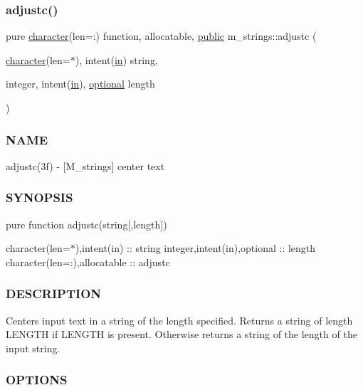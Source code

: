 \subsubsection{\texorpdfstring{adjustc()}{adjustc()}}
{\footnotesize\ttfamily pure \hyperlink{option__stopwatch_83_8txt_abd4b21fbbd175834027b5224bfe97e66}{character}(len=\+:) function, allocatable, \hyperlink{M__stopwatch_83_8txt_a2f74811300c361e53b430611a7d1769f}{public} m\+\_\+strings\+::adjustc (\begin{DoxyParamCaption}\item[{\hyperlink{option__stopwatch_83_8txt_abd4b21fbbd175834027b5224bfe97e66}{character}(len=$\ast$), intent(\hyperlink{M__journal_83_8txt_afce72651d1eed785a2132bee863b2f38}{in})}]{string,  }\item[{integer, intent(\hyperlink{M__journal_83_8txt_afce72651d1eed785a2132bee863b2f38}{in}), \hyperlink{option__stopwatch_83_8txt_aa4ece75e7acf58a4843f70fe18c3ade5}{optional}}]{length }\end{DoxyParamCaption})}



\subsubsection*{N\+A\+ME}

adjustc(3f) -\/ \mbox{[}M\+\_\+strings\mbox{]} center text 

\subsubsection*{S\+Y\+N\+O\+P\+S\+IS}

pure function adjustc(string\mbox{[},length\mbox{]})

character(len=$\ast$),intent(in) \+:\+: string integer,intent(in),optional \+:\+: length character(len=\+:),allocatable \+:\+: adjustc

\subsubsection*{D\+E\+S\+C\+R\+I\+P\+T\+I\+ON}

Centers input text in a string of the length specified. Returns a string of length L\+E\+N\+G\+TH if L\+E\+N\+G\+TH is present. Otherwise returns a string of the length of the input string. \subsubsection*{O\+P\+T\+I\+O\+NS}

